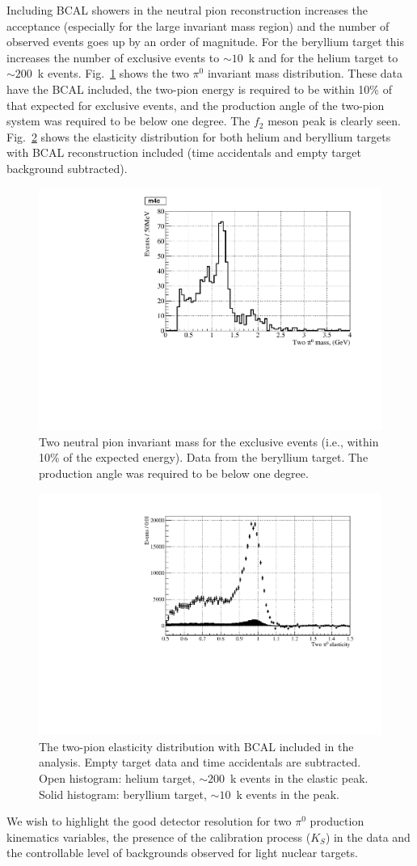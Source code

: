 Including BCAL showers in the neutral pion reconstruction increases
the acceptance (especially for the large invariant mass region) and the number
of observed events goes up by an order of magnitude. For the beryllium target
this increases the number of exclusive events to $\sim 10$~k and for
the helium target to $\sim 200$~k events. Fig.~\ref{fig:bemass}
shows the two $\pi^0$ invariant mass distribution. These data have the BCAL included,
the two-pion energy is required to be within
10\% of that expected for exclusive events, and the production angle
of the two-pion system was required to be below one degree. The $f_2$ meson
peak is clearly seen. Fig.~\ref{fig:beheelast} shows the elasticity
distribution for both helium and beryllium targets with BCAL
reconstruction included (time accidentals and empty target
background subtracted).
\begin{figure}[!h]
\centering\includegraphics[width=4.75in]{figures/be_mass.pdf}
\caption{Two neutral pion invariant mass for the exclusive events
  (i.e., within 10\% of the expected energy). Data from the beryllium target. The production angle
  was required to be below one degree.
\label{fig:bemass}}
\end{figure}
\begin{figure}[!h]
\centering\includegraphics[width=4.5in]{figures/hebe_elast.pdf}
\caption{The two-pion elasticity distribution with BCAL included in the
  analysis. Empty target data and time accidentals are subtracted. Open
  histogram: helium target, $\sim 200$~k events in the elastic
  peak. Solid histogram: beryllium target, $\sim 10$~k events in
  the peak.
\label{fig:beheelast}}
\end{figure}

We wish to highlight the good detector
resolution for two $\pi^0$ production kinematics variables, the
presence of the calibration process ($K_S$) in the data and the
controllable level of backgrounds observed for light nuclear targets.
